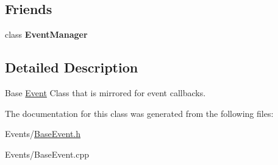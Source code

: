 \subsection*{Friends}
\begin{DoxyCompactItemize}
\item 
\mbox{\label{classBaseEvent_aba45a46c615e2683daffdae82e2d3b8f}} 
class {\bfseries Event\+Manager}
\end{DoxyCompactItemize}


\subsection{Detailed Description}
Base \hyperlink{classEvent}{Event} Class that is mirrored for event callbacks. 

The documentation for this class was generated from the following files\+:\begin{DoxyCompactItemize}
\item 
Events/\hyperlink{BaseEvent_8h}{Base\+Event.\+h}\item 
Events/Base\+Event.\+cpp\end{DoxyCompactItemize}
